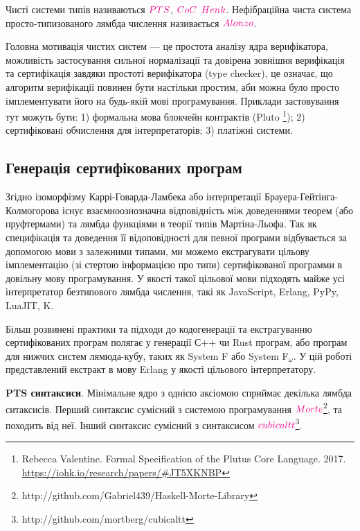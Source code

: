 Чисті системи типів називаються $\textcolor{magenta}{PTS}$, $\textcolor{magenta}{CoC}$
$\textcolor{magenta}{Henk}$. Нефібраційна чиста система просто-типизованого лямбда числення
називається $\textcolor{magenta}{Alonzo}$.

Головна мотивація чистих систем --- це простота аналізу ядра верифікатора,
можливість застосування сильної нормалізації та довірена зовнішня верифікація
та сертифікація завдяки простоті верифікатора (type checker), це означає, що
алгоритм верифікації повинен бути настільки простим, аби можна було
просто імплементувати його на будь-якій мові програмування. Приклади застовування
тут можуть бути:
1) формальна мова блокчейн контрактів (Pluto
   \footnote{Rebecca Valentine. Formal Specification of the Plutus Core Language. 2017.
             \url{https://iohk.io/research/papers/\#JT5XKNBP}});
2) сертифіковані обчислення для інтерпретаторів;
3) платіжні системи.

\subsection{Генерація сертифікованих програм}
Згідно ізоморфізму Каррі-Говарда-Ламбека або інтерпретації Брауера-Гейтінга-Колмогорова
існує взаємноознозначна відповідність між доведеннями теорем (або пруфтермами)
та лямбда функціями в теорії типів Мартіна-Льофа\cite{Lof84}.
Так як специфікація та доведення її відоповідності для певної програми
відбувається за допомогою мови з залежними типами, ми можемо екстрагувати
цільову імплементацію (зі стертою інформацією про типи) сертифікованої программи
в довільну мову програмування. У якості такої цільової мови підходять
майже усі інтерпретатор безтипового лямбда числення, такі як JavaScript,
Erlang, PyPy, LuaJIT, K.

Більш розвинені практики та підходи до кодогенерації та екстрагуванню
сертифікованих програм полягає у генерації С++ чи Rust програм, або програм
для нижчих систем лямюда-кубу, таких як System F або System F$_\omega$.
У цій роботі представлений екстракт в мову Erlang у якості цільового інтерпретатору.

\textbf{PTS синтаксиси}. Мінімальне ядро з однією аксіомою
сприймає декілька лямбда ситаксисів.
Перший синтаксис сумісний з системою програмування
$\textcolor{magenta}{Morte}$\footnote{http://github.com/Gabriel439/Haskell-Morte-Library}, та походить від неї.
Інший синтаксис сумісний з синтаксисом $\textcolor{magenta}{cubicaltt}$\footnote{http://github.com/mortberg/cubicaltt}.

